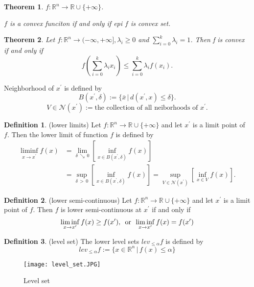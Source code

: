 \documentclass{jsarticle}
\newtheorem{thm}{Theorem}[section]
\theoremstyle{definition}
\newtheorem{dfn}{Definition}[section]
\begin{document}
\begin{thm}
$f: \mathbb{R}^n \to \mathbb{R} \cup \{+ \infty \}$.

$f$ is a convex funciton if and only if  \textup{epi} $f$ is convex set. 
\end{thm}

\begin{thm}
Let $f: \mathbb{R}^n \to (-\infty, + \infty], \lambda_i \ge 0$ and $\sum \limits_{i=0}^{k} \lambda_i = 1$. Then f is convex if and only if 
\[
f(\sum \limits_{i=0}^{k} \lambda_i x_i) \le \sum \limits_{i=0}^{k} \lambda_i f(x_i).
\]
\end{thm}


Neighborhood of $x^{\prime}$ is defined by
\[
B(x^{\prime}, \delta) := \{\bar{x} \, | \, d(x^{\prime},  x) \le \delta \}.
\]
\[
V \in \mathcal{N}(x^{\prime}) := \text{the collection of all neiborhoods of $x^{\prime}$}.
\]

\begin{dfn}(lower limits)
    Let $f: \mathbb{R}^n \to \mathbb{R} \cup \{+ \infty\}$ and let $x^{\prime}$ is a limit point of $f$. Then the lower limit of function $f$ is defined by 
    \begin{align*}
        \liminf_{x \to x^{\prime}}{f(x)} &= \lim_{\delta \, \searrow \, 0} {[\inf_{x \in B(x^{\prime}, \delta)}{f(x)}]} \\
                                          &= \sup_{\delta \, > \, 0} {[\inf_{x \in B(x^{\prime}, \delta)}{f(x)}]} 
                                          = \sup_{V \in \mathcal{N}(x^{\prime})} {[\inf_{x \in V}{f(x)}]}. 
    \end{align*}
\end{dfn}

\begin{dfn}(lower semi-continuous)
    Let $f: \mathbb{R}^n \to \mathbb{R} \cup \{+ \infty\}$ and let $x^{\prime}$ is a limit point of $f$. Then $f$ is lower semi-continuous at $x^{\prime}$ if and only if
    \[
        \liminf_{x \to x^{\prime}} {f(x)} \ge f(x^{\prime}), \text{\, or \,} \liminf_{x \to x^{\prime}} {f(x)} = f(x^{\prime}) 
    \]
\end{dfn}

\begin{dfn}(level set)
The lower level sets $lev_{\le \alpha}{f}$ is defined by
\[
lev_{\le \alpha} f := \{x \in \mathbb{R}^n \, | \, f(x) \le \alpha \}
\]
\end{dfn}

\begin{figure}[htbp]
\begin{center}
\texttt{[image: level\_set.JPG]}
\caption{Level set}
\end{center}
\end{figure}
\end{document}
